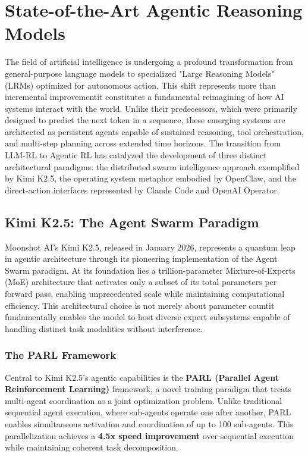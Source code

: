 \section{ State-of-the-Art Agentic Reasoning Models}

The field of artificial intelligence is undergoing a profound transformation from general-purpose language models to specialized "Large Reasoning Models" (LRMs) optimized for autonomous action. This shift represents more than incremental improvementit constitutes a fundamental reimagining of how AI systems interact with the world. Unlike their predecessors, which were primarily designed to predict the next token in a sequence, these emerging systems are architected as persistent agents capable of sustained reasoning, tool orchestration, and multi-step planning across extended time horizons. The transition from LLM-RL to Agentic RL has catalyzed the development of three distinct architectural paradigms: the distributed swarm intelligence approach exemplified by Kimi K2.5, the operating system metaphor embodied by OpenClaw, and the direct-action interfaces represented by Claude Code and OpenAI Operator.

\subsection{Kimi K2.5: The Agent Swarm Paradigm}

Moonshot AI's Kimi K2.5, released in January 2026, represents a quantum leap in agentic architecture through its pioneering implementation of the Agent Swarm paradigm. At its foundation lies a trillion-parameter Mixture-of-Experts (MoE) architecture that activates only a subset of its total parameters per forward pass, enabling unprecedented scale while maintaining computational efficiency. This architectural choice is not merely about parameter countit fundamentally enables the model to host diverse expert subsystems capable of handling distinct task modalities without interference.

\subsubsection{The PARL Framework}

Central to Kimi K2.5's agentic capabilities is the \textbf{PARL (Parallel Agent Reinforcement Learning)} framework, a novel training paradigm that treats multi-agent coordination as a joint optimization problem. Unlike traditional sequential agent execution, where sub-agents operate one after another, PARL enables simultaneous activation and coordination of up to 100 sub-agents. This parallelization achieves a \textbf{4.5x speed improvement} over sequential execution while maintaining coherent task decomposition.

